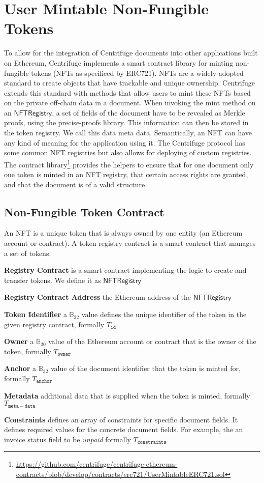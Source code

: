 \section{User Mintable Non-Fungible Tokens}
\label{sec:nft}
To allow for the integration of Centrifuge documents into other applications built on Ethereum, Centrifuge implements a smart contract library for minting non-fungible tokens (NFTs as specificed by ERC721). NFTs are a widely adopted standard to create objects that have trackable and unique ownership. Centrifuge extends this standard with methods that allow users to mint these NFTs based on the private off-chain data in a document. When invoking the mint method on an $\mathsf{NFTRegistry}$, a set of fields of the document have to be revealed as Merkle proofs, using the precise-proofs library. This information can then be stored in the token registry. We call this data meta data. Semantically, an NFT can have any kind of meaning for the application using it. The Centrifuge protocol has some common NFT registries but also allows for deploying of custom registries. The contract library\footnote{\url{https://github.com/centrifuge/centrifuge-ethereum-contracts/blob/develop/contracts/erc721/UserMintableERC721.sol}} provides the helpers to ensure that for one document only one token is minted in an NFT registry, that certain access rights are granted, and that the document is of a valid structure. 

\subsection{Non-Fungible Token Contract}
An NFT is a unique token that is always owned by one entity (an Ethereum account or contract). A token registry contract is a smart contract that manages a set of tokens.
\begin{description}
\item{\textbf{Registry Contract}} is a smart contract implementing the logic to create and transfer tokens. We define it as $\mathsf{NFTRegistry}$
\item{\textbf{Registry Contract Address}} the Ethereum address of the  $\mathsf{NFTRegistry}$ 
\item{\textbf{Token Identifier}} a $\mathbb{B}_{32}$ value defines the unique identifier of the token in the given registry contract, formally $T_{\mathtt{id}}$
\item{\textbf{Owner}} a $\mathbb{B}_{20}$ value of the Ethereum account or contract that is the owner of the token, formally $T_{\mathtt{owner}}$
\item{\textbf{Anchor}} a $\mathbb{B}_{32}$ value of the document identifier that the token is minted for, formally $T_{\mathtt{anchor}}$  %
\item{\textbf{Metadata}} additional data that is supplied when the token is minted, formally $T_{\mathtt{meta-data}}$
\item{\textbf{Constraints}} defines an array of constraints for specific document fields. It  defines required values for the concrete document fields. For example, the an invoice status field to be \textit{unpaid} formally $T_{\mathtt{constraints}}$
\end{description}
